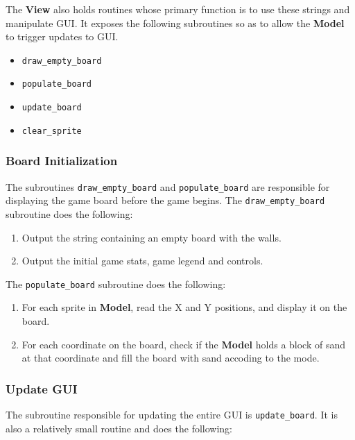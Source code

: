    The \textbf{View} also holds routines whose primary function is to use these strings and manipulate GUI.
    It exposes the following subroutines so as to allow the \textbf{Model} to trigger updates to GUI.

    \begin{itemize}
      \item \texttt{draw\_empty\_board}
      \item \texttt{populate\_board}
      \item \texttt{update\_board}
      \item \texttt{clear\_sprite}
    \end{itemize}


 
    \subsubsection{Board Initialization}

    The subroutines \texttt{draw\_empty\_board} and \texttt{populate\_board} are responsible for displaying the game board before the game begins.
    The \texttt{draw\_empty\_board} subroutine does the following:

    \begin{enumerate}
      \item Output the string containing an empty board with the walls.
      \item Output the initial game stats, game legend and controls.
    \end{enumerate}

    The \texttt{populate\_board} subroutine does the following:

    \begin{enumerate}
      \item For each sprite in \textbf{Model}, read the X and Y positions, and display it on the board.
      \item For each coordinate on the board, check if the \textbf{Model} holds a block of sand at that coordinate and fill the board with sand accoding to the mode.
    \end{enumerate}

    \subsubsection{Update GUI}

    The subroutine responsible for updating the entire GUI is \texttt{update\_board}. It is also a relatively small routine and does the following:
    
